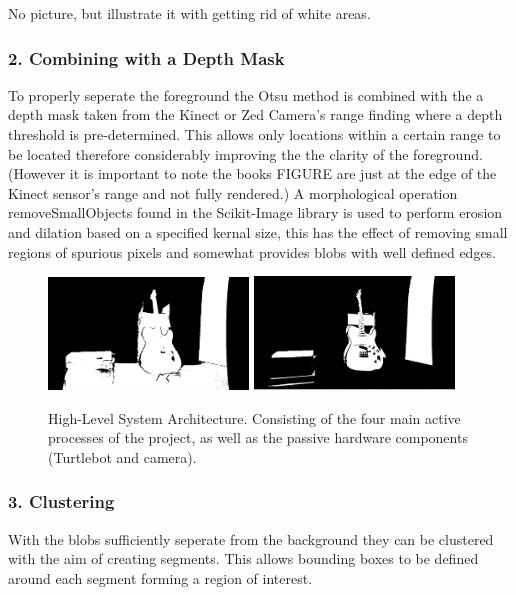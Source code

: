 \documentclass{mproj}
\begin{document}
No picture, but illustrate it with getting rid of white areas.

\subsubsection{2. Combining with a Depth Mask}

To properly seperate the foreground the Otsu method is combined with the a depth mask taken from the Kinect or Zed Camera's range finding where a depth threshold is pre-determined. This allows only locations within a certain range to be located therefore considerably improving the the clarity of the foreground. (However it is important to note the books FIGURE are just at the edge of the Kinect sensor's range and not fully rendered.) A morphological operation removeSmallObjects found in the Scikit-Image library is used to perform erosion and dilation based on a specified kernal size, this has the effect of removing small regions of spurious pixels and somewhat provides blobs with well defined edges.

\begin{figure}
   \caption{High-Level System Architecture. Consisting of the four main active processes of the project, as well as the passive hardware components (Turtlebot and camera).}
   \centering
   \includegraphics[width=0.475\textwidth]{images/depth.png}
   \hfill
   \includegraphics[width=0.475\textwidth]{images/combined.png}
\end{figure}

\subsubsection{3. Clustering}

With the blobs sufficiently seperate from the background they can be clustered with the aim of creating segments. This allows bounding boxes to be defined around each segment forming a region of interest. 
\end{document}
